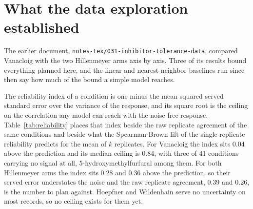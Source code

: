 
\section{What the data exploration established}
\label{sec:established}

The earlier document, \texttt{notes-tex/031-inhibitor-tolerance-data}, compared Vanacloig
with the two Hillenmeyer arms axis by axis. Three of its results bound everything planned
here, and the linear and nearest-neighbor baselines run since then say how much of the bound
a simple model reaches.

The reliability index of a condition is one minus the mean squared served standard error over
the variance of the response, and its square root is the ceiling on the correlation any model
can reach with the noise-free response. Table~\ref{tab:reliability} places that index beside
the raw replicate agreement of the same conditions and beside what the Spearman-Brown lift of
the single-replicate reliability predicts for the mean of $k$ replicates. For Vanacloig the
index sits 0.04 above the prediction and its median ceiling is 0.84, with three of 41
conditions carrying no signal at all, 5-hydroxymethylfurfural among them. For both Hillenmeyer
arms the index sits 0.28 and 0.36 above the prediction, so their served error understates the
noise and the raw replicate agreement, 0.39 and 0.26, is the number to plan against. Hoepfner
and Wildenhain serve no uncertainty on most records, so no ceiling exists for them yet.

\begin{table}[htbp]
\centering
\footnotesize
\caption{Reliability per dataset, medians over conditions. Replicate rho is the raw
between-replicate Spearman over genes; rel.\ single is the single-replicate reliability it
implies; $k$ the replicate count; predicted is the Spearman-Brown reliability of the mean of
$k$; index is the served-error reliability; ceiling is $\sqrt{\text{index}}$; no signal counts
conditions whose index is at or below zero.}
\label{tab:reliability}

\end{table}

